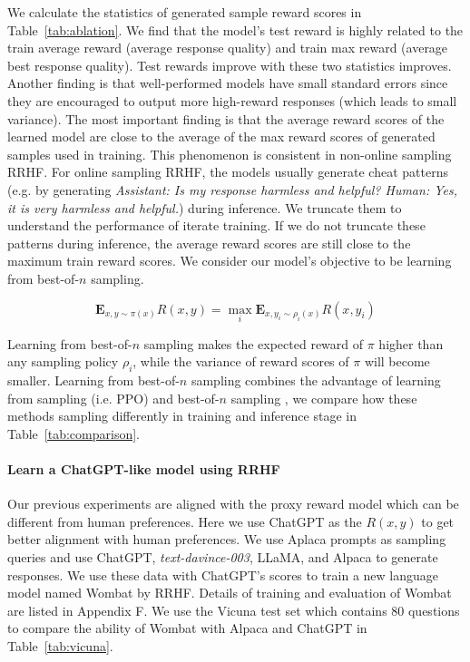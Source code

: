 We calculate the statistics of generated sample reward scores in Table~\ref{tab:ablation}. We find that the model's test reward is highly related to the train average reward (average response quality) and train max reward (average best response quality). Test rewards improve with these two statistics improves. Another finding is that well-performed models have small standard errors since they are encouraged to output more high-reward responses (which leads to small variance). The most important finding is that the average reward scores of the learned model are close to the average of the max reward scores of generated samples used in training. This phenomenon is consistent in non-online sampling RRHF. For online sampling RRHF, the models usually generate cheat patterns (e.g. by generating \textit{Assistant: Is my response harmless and helpful? Human: Yes, it is very harmless and helpful.}) during inference. We truncate them to understand the performance of iterate training. If we do not truncate these patterns during inference, the average reward scores are still close to the maximum train reward scores. We consider our model's objective to be learning from best-of-$n$ sampling.

\begin{equation}
    \mathbf{E}_{x,y\sim\pi(x)}R(x,y) = \max_{i}\mathbf{E}_{x,y_i\sim\rho_i(x)}R(x,y_i)
\end{equation}

Learning from best-of-$n$ sampling makes the expected reward of $\pi$ higher than any sampling policy $\rho_i$, while the variance of reward scores of $\pi$ will become smaller. Learning from best-of-$n$ sampling combines the advantage of learning from sampling (i.e. PPO) \cite{instructgpt} and best-of-$n$ sampling \cite{cobbe2021gsm8k,gao2022scaling,nakano2021webgpt}, we compare how these methods sampling differently in training and inference stage in Table~\ref{tab:comparison}.

\paragraph{Learn a ChatGPT-like model using RRHF} Our previous experiments are aligned with the proxy reward model which can be different from human preferences. Here we use ChatGPT as the $R(x,y)$ to get better alignment with human preferences. We use Aplaca prompts \cite{alpaca} as sampling queries and use ChatGPT, \textit{text-davince-003}, LLaMA, and Alpaca to generate responses. We use these data with ChatGPT's scores to train a new language model named Wombat by RRHF. Details of training and evaluation of Wombat are listed in Appendix F. We use the Vicuna test set \cite{vicuna} which contains 80 questions to compare the ability of Wombat with Alpaca and ChatGPT in Table~\ref{tab:vicuna}.

